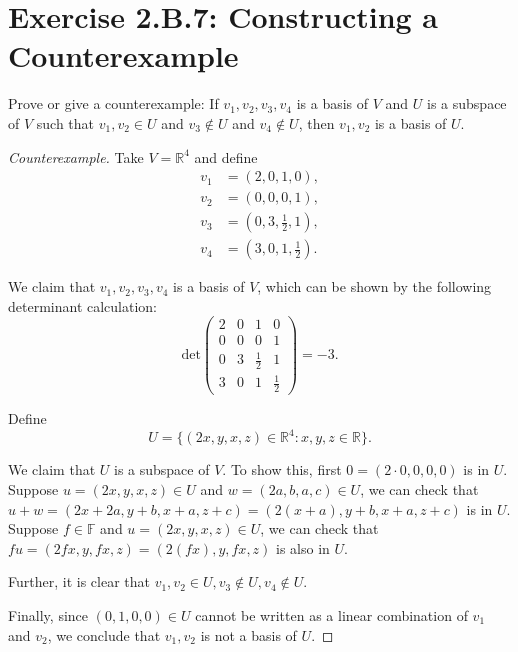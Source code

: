 \section{Exercise 2.B.7: Constructing a Counterexample}\label{Exercise 2.B.7}
Prove or give a counterexample: If $v_1, v_2, v_3, v_4$ is a basis of $V$ and $U$ is a subspace of $V$ such that $v_1, v_2\in U$ and $v_3\notin U$ and $v_4\notin U$, then $v_1, v_2$ is a basis of $U$.
\begin{proof}[Counterexample]
Take $V=\mathbb{R}^4$ and define
\begin{equation*}
\begin{split}
v_1&=(2,0,1,0),\\
v_2&=(0,0,0,1),\\
v_3&=(0,3,\frac{1}{2},1),\\
v_4&=(3,0,1,\frac{1}{2}).
\end{split}
\end{equation*}

We claim that $v_1,v_2,v_3,v_4$ is a basis of $V$, which can be shown by the following determinant calculation:\[
\text{det}\left(
\begin{matrix}
2&0&1&0\\
0&0&0&1\\
0&3&\frac{1}{2}&1\\
3&0&1&\frac{1}{2}
\end{matrix}
\right)=-3.
\]

Define\[
U=\{(2x,y,x,z)\in\mathbb{R}^4:x,y,z\in\mathbb{R}\}.
\]

We claim that $U$ is a subspace of $V$. To show this, first $0=(2\cdot 0,0,0,0)$ is in $U$. Suppose $u=(2x,y,x,z)\in U$ and $w=(2a,b,a,c)\in U$, we can check that $u+w=(2x+2a,y+b,x+a,z+c)=(2(x+a),y+b,x+a,z+c)$ is in $U$. Suppose $f\in\mathbb{F}$ and $u=(2x,y,x,z)\in U$, we can check that $fu=(2fx,y,fx,z)=(2(fx),y,fx,z)$ is also in $U$.

Further, it is clear that $v_1,v_2\in U, v_3\notin U, v_4\notin U$.

Finally, since $(0,1,0,0)\in U$ cannot be written as a linear combination of $v_1$ and $v_2$, we conclude that $v_1,v_2$ is not a basis of $U$.
\end{proof}

